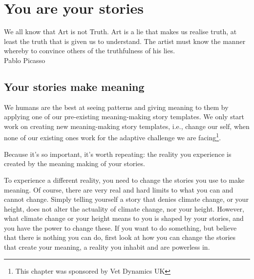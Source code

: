 ﻿\chapter{You are your stories}
\label{chapter:who-am-i-meaning}


\begin{chapterquotation}
We all know that Art is not Truth. Art is a lie that makes us realise truth, at least the truth that is given us to understand. The artist must know the manner whereby to convince others of the truthfulness of his lies. \\
\raggedleft\textemdash Pablo Picasso
\end{chapterquotation}


\section{Your stories make meaning}
We humans are the best at seeing patterns and giving meaning to them by applying one of our pre-existing meaning-making story  templates. We only start work on creating new meaning-making story templates, i.e., change our self, when none of our existing ones work for the adaptive challenge we are facing\footnote{This chapter was sponsored by Vet Dynamics UK}. 


Because it's so important, it's worth repeating: the reality you experience is created by the meaning making of your stories.


To experience a different reality, you need to change the stories you use to make meaning. Of course, there are very real and hard limits to what you can and cannot change. Simply telling yourself a story that denies climate change, or your height, does not alter the actuality of climate change, nor your height. However, what climate change or your height means to you is shaped by your stories, and you have the power to change these. If you want to do something, but believe that there is nothing you can do, first look at how you can change the stories that create your meaning, a reality you inhabit and are powerless in.


